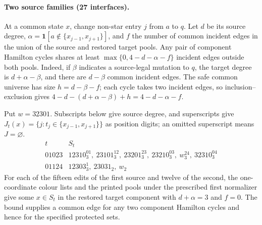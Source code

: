 \paragraph{Two source families (27 interfaces).}
At a common state $x$, change non-star entry $j$ from $a$ to $q$.
Let $d$ be its source degree, $\alpha=\mathbf1[a\notin
\{x_{j-1},x_{j+1}\}]$, and $f$ the number of common incident edges
in the union of the source and restored target pools.
Any pair of component Hamilton cycles shares at least
$\max\{0,4-d-\alpha-f\}$ incident edges outside both pools.
Indeed, if $\beta$ indicates a source-legal mutation to $q$, the
target degree is $d+\alpha-\beta$, and there are $d-\beta$ common
incident edges. The safe common universe has size $h=d-\beta-f$;
each cycle takes two incident edges, so inclusion--exclusion gives
$4-d-(d+\alpha-\beta)+h=4-d-\alpha-f$.

Put $w=32301$. Subscripts below give source degree, and superscripts
give $J_t(x)=\{j:t_j\in\{x_{j-1},x_{j+1}\}\}$ as position digits;
an omitted superscript means $J=\varnothing$.
\[
\begin{array}{c|l}
t&S_t\\ \hline
01023&12310_3^{01},\ 23101_3^{12},\ 23201_3^{23},\ 23210_3^{03},\ w_3^{24},\ 32310_3^{04}\\
01124&12303_3^1,\ 23031_2,\ w_2
\end{array}
\]
For each of the fifteen edits of the first source and twelve of the
second, the one-coordinate colour lists and the printed pools under
the prescribed first normalizer give some $x\in S_t$ in the restored
target component with $d+\alpha=3$ and $f=0$.
The bound supplies a common edge for any two component Hamilton
cycles and hence for the specified protected sets.

